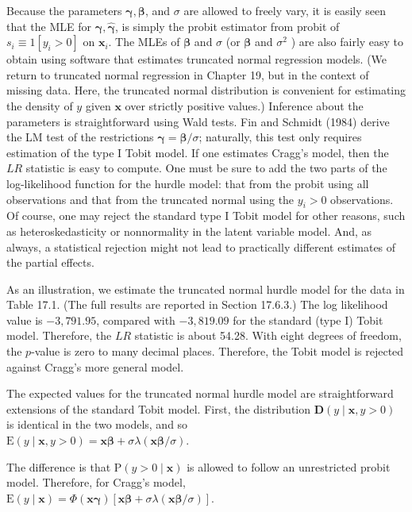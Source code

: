 \documentclass[10pt]{article}
\begin{document}
Because the parameters $\boldsymbol{\gamma}, \boldsymbol{\beta}$, and $\sigma$ are allowed to freely vary, it is easily seen that the MLE for $\boldsymbol{\gamma}, \hat{\boldsymbol{\gamma}}$, is simply the probit estimator from probit of $s_{i} \equiv 1\left[y_{i}>0\right]$ on $\mathbf{x}_{i}$. The MLEs of $\boldsymbol{\beta}$ and $\sigma$ (or $\boldsymbol{\beta}$ and $\sigma^{2}$ ) are also fairly easy to obtain using software that estimates truncated normal regression models. (We return to truncated normal regression in Chapter 19, but in the context of missing data. Here, the truncated normal distribution is convenient for estimating the density of $y$ given $\mathbf{x}$ over strictly positive values.) Inference about the parameters is straightforward using Wald tests. Fin and Schmidt (1984) derive the LM test of the restrictions $\boldsymbol{\gamma}=\boldsymbol{\beta} / \sigma$; naturally, this test only requires estimation of the type I Tobit model. If one estimates Cragg's model, then the $L R$ statistic is easy to compute. One must be sure to add the two parts of the log-likelihood function for the hurdle model: that from the probit using all observations and that from the truncated normal using the $y_{i}>0$ observations. Of course, one may reject the standard type I Tobit model for other reasons, such as heteroskedasticity or nonnormality in the latent variable model. And, as always, a statistical rejection might not lead to practically different estimates of the partial effects.

As an illustration, we estimate the truncated normal hurdle model for the data in Table 17.1. (The full results are reported in Section 17.6.3.) The log likelihood value is $-3,791.95$, compared with $-3,819.09$ for the standard (type I) Tobit model. Therefore, the $L R$ statistic is about 54.28. With eight degrees of freedom, the $p$-value is zero to many decimal places. Therefore, the Tobit model is rejected against Cragg's more general model.

The expected values for the truncated normal hurdle model are straightforward extensions of the standard Tobit model. First, the distribution $\mathbf{D}(y \mid \mathbf{x}, y>0)$ is identical in the two models, and so\\
$\mathrm{E}(y \mid \mathbf{x}, y>0)=\mathbf{x} \boldsymbol{\beta}+\sigma \lambda(\mathbf{x} \boldsymbol{\beta} / \sigma)$.

The difference is that $\mathrm{P}(y>0 \mid \mathbf{x})$ is allowed to follow an unrestricted probit model. Therefore, for Cragg's model,\\
$\mathrm{E}(y \mid \mathbf{x})=\Phi(\mathbf{x} \boldsymbol{\gamma})[\mathbf{x} \boldsymbol{\beta}+\sigma \lambda(\mathbf{x} \boldsymbol{\beta} / \sigma)]$.
\end{document}
